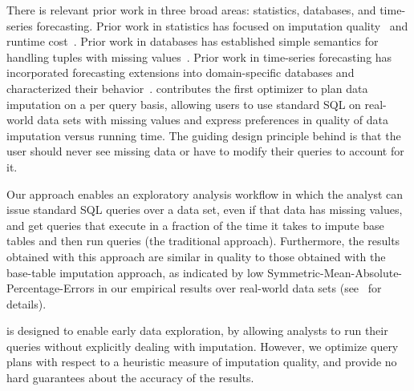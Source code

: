 There is relevant prior work in three broad areas: statistics, databases, and time-series forecasting.
Prior work in statistics has focused on imputation quality~\cite{burgette2010multiple} and runtime cost~\cite{akande2015empirical}.
Prior work in databases has established simple semantics for handling tuples with missing values~\cite{codd1973understanding,grant1977null}.
Prior work in time-series forecasting has incorporated forecasting extensions into domain-specific databases and characterized their behavior~\cite{parisi2011embedding,parisi2013temporal,duan2007processing}.
\ProjectName{} contributes the first optimizer to plan data imputation on a per query basis, allowing users to use standard SQL on real-world data sets with missing values
and express preferences in quality of data imputation versus running time. The guiding design principle behind \ProjectName{} is that the user should never see missing data or have to modify their queries to account for it.

Our approach enables an exploratory analysis workflow in which the analyst can issue standard SQL queries over a data set, even if that data has missing values, and get
queries that execute in a fraction of the time it takes to impute base tables and then run queries (the traditional approach). Furthermore, the results obtained with this approach
are similar in quality to those obtained with the base-table imputation approach, as indicated by low Symmetric-Mean-Absolute-Percentage-Errors in our empirical results
over real-world data sets (see~ for details).

\ProjectName{} is designed to enable early data exploration, by allowing analysts to run their queries without explicitly dealing with imputation.
However, we optimize query plans with respect to a heuristic measure of imputation quality, and provide no hard guarantees about the accuracy of the results.

